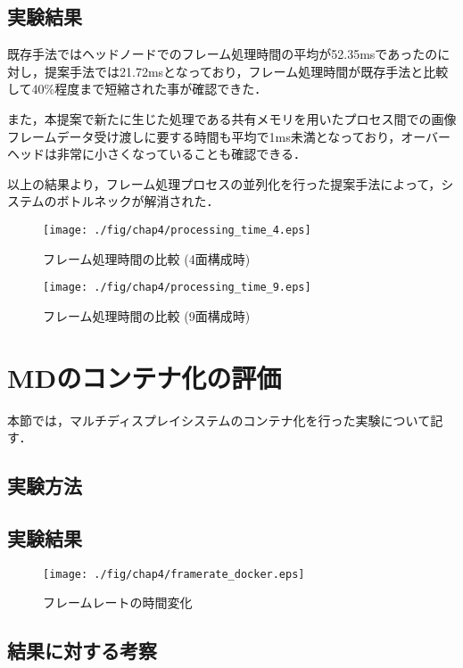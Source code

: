 \subsection{実験結果}

既存手法ではヘッドノードでのフレーム処理時間の平均が52.35msであったのに対し，提案手法では21.72msとなっており，フレーム処理時間が既存手法と比較して40\%程度まで短縮された事が確認できた．

また，本提案で新たに生じた処理である共有メモリを用いたプロセス間での画像フレームデータ受け渡しに要する時間も平均で1ms未満となっており，オーバーヘッドは非常に小さくなっていることも確認できる．

以上の結果より，フレーム処理プロセスの並列化を行った提案手法によって，システムのボトルネックが解消された．

\begin{figure}[H]
    \hspace*{\fill}
    \texttt{[image: ./fig/chap4/processing\_time\_4.eps]}
    \hspace*{\fill}
    \caption{フレーム処理時間の比較 (4面構成時)}
\end{figure}

\begin{figure}[H]
    \hspace*{\fill}
    \texttt{[image: ./fig/chap4/processing\_time\_9.eps]}
    \hspace*{\fill}
    \caption{フレーム処理時間の比較 (9面構成時)}
\end{figure}

\section{MDのコンテナ化の評価}
本節では，マルチディスプレイシステムのコンテナ化を行った実験について記す．

\subsection{実験方法}


\subsection{実験結果}

\begin{figure}[H]
    \hspace*{\fill}
    \texttt{[image: ./fig/chap4/framerate\_docker.eps]}
    \hspace*{\fill}
    \caption{フレームレートの時間変化}
\end{figure}



\subsection{結果に対する考察}
